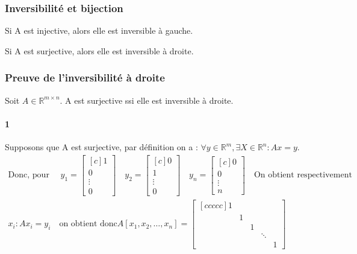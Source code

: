 \documentclass[a4paper]{book}
\begin{document}
\subsubsection{Inversibilité et bijection}
\begin{minipage}{\linewidth}
    \begin{minipage}{.45\linewidth}
        \begin{framed}
            Si A est injective, alors elle est inversible à gauche.
        \end{framed}
    \end{minipage}
    \begin{minipage}{.45\linewidth}
        \begin{framed}
            Si A est surjective, alors elle est inversible à droite.
        \end{framed}
    \end{minipage}
\end{minipage}
\subsubsection{Preuve de l'inversibilité à droite}
Soit $A \in \mathbb{R}^{m\times n}$. A est surjective ssi elle est inversible à droite.
\paragraph{1}
Supposons que A est surjective, par définition on a : $\forall y \in \mathbb{R}^m,\exists X \in \mathbb{R}^n : Ax = y$.
\begin{gather}
    \text{Donc, pour } \quad y_1 = \begin{bmatrix}[c]1\\0\\\vdots \\0\end{bmatrix} \quad y_2 = \begin{bmatrix}[c]0\\1\\\vdots \\0\end{bmatrix} \quad y_n = \begin{bmatrix}[c]0\\0\\\vdots \\n\end{bmatrix} \quad \text{On obtient respectivement} \\
    x_i : Ax_i = y_i \quad \text{on obtient donc} A[x_1,x_2,\dots,x_n] = \begin{bmatrix}[ccccc]
    1&&&&\\
    &1&&&\\
    &&1&&\\
    &&&\ddots&\\
    &&&&1
    \end{bmatrix}
\end{gather}
\end{document}
